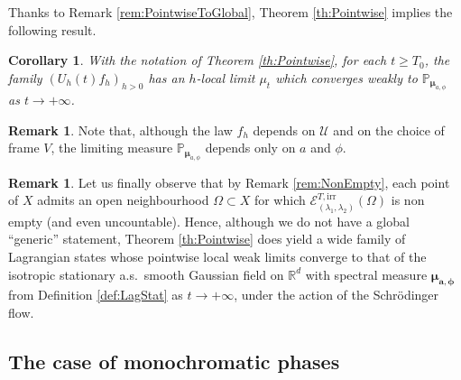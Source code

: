 \documentclass[10pt]{amsart}
\let\mathcal\mathscr
\newcommand{\irr}{\mathrm{irr}}
\theoremstyle{plain}
\newtheorem{corollary}[theorem]{Corollary}
\theoremstyle{definition}
\newtheorem{remark}[theorem]{Remark}
\newcommand{\R}{\mathbb{R}}
\def\calE{\mathcal{E}}
\def\calU{\mathcal{U}}
\begin{document}
Thanks to Remark \ref{rem:PointwiseToGlobal}, Theorem \ref{th:Pointwise} implies the following result.

\begin{corollary}
With the notation of Theorem \ref{th:Pointwise}, for each $t\geq T_0$, the family $\left(U_h(t) f_h\right)_{h>0}$ has an $h$-local limit $\mu_t$ which converges weakly to $\mathbb{P}_{\boldsymbol{\mu}_{a, \phi}}$ as $t\to+\infty$.
\end{corollary}

\begin{remark}
Note that, although the law $f_h$ depends on $\calU$ and on the choice of frame $V$, the limiting measure $\mathbb{P}_{\boldsymbol{\mu}_{a, \phi}}$ depends only on $a$ and $\phi$.
\end{remark}

\begin{remark}
Let us finally observe that by Remark \ref{rem:NonEmpty}, each point of $X$ admits an open neighbourhood $\Omega\subset X$ for which $\calE^{T,\irr}_{(\lambda_1,\lambda_2)}(\Omega)$ is non empty (and even uncountable). Hence, although we do not have a global ``generic'' statement, Theorem \ref{th:Pointwise} does yield a wide family of Lagrangian states whose pointwise local weak limits converge to that of the isotropic stationary a.s.\ smooth Gaussian field on $\R^d$ with spectral measure $\boldsymbol{\mu_{a,\phi}}$ from Definition \ref{def:LagStat} as $t\to+\infty$, under the action of the Schrödinger flow.
\end{remark}

\subsection{The case of monochromatic phases}\label{sec:IntroMono}
\end{document}
